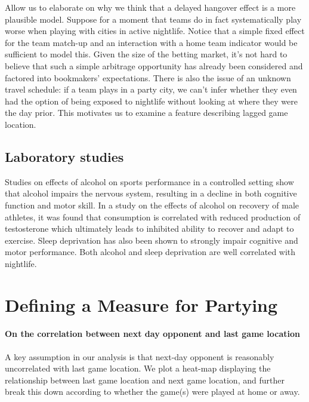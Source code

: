 \documentclass[letterpaper,12pt]{article}
\begin{document}
Allow us to elaborate on why we think that a delayed hangover effect is a more plausible model.
Suppose for a moment that teams do in fact systematically play worse when playing with cities in active nightlife.
Notice that a simple fixed effect for the team match-up and an interaction with a home team indicator would be sufficient to model this.
Given the size of the betting market, it's not hard to believe that such a simple arbitrage opportunity has already been considered
and factored into bookmakers' expectations. There is also the issue of an unknown travel schedule: if a team plays in a party city,
we can't infer whether they even had the option of being exposed to nightlife without looking at where they were the day prior.
This motivates us to examine a feature describing lagged game location.


\subsection{Laboratory studies}
Studies on effects of alcohol on sports performance in a controlled setting
show that alcohol impairs the nervous system, resulting in a decline in both
cognitive function and motor skill.\citep{shirreffs} In a study on 
the effects of alcohol on recovery of male athletes, it was found that
consumption is correlated with reduced production of testosterone
which ultimately leads to inhibited ability to recover and adapt to exercise.\citep{mjbarnes}
Sleep deprivation has also been shown to strongly impair cognitive and motor performance.\citep{pilcher} Both alcohol and sleep deprivation are well correlated with nightlife.


\section{Defining a Measure for Partying}

\paragraph{On the correlation between next day opponent and last game location}
A key assumption in our analysis is that next-day opponent is reasonably uncorrelated with
last game location. We plot a heat-map displaying the relationship between last game location
and next game location, and further break this down according to whether the game(s) were played at home or away.
\end{document}
